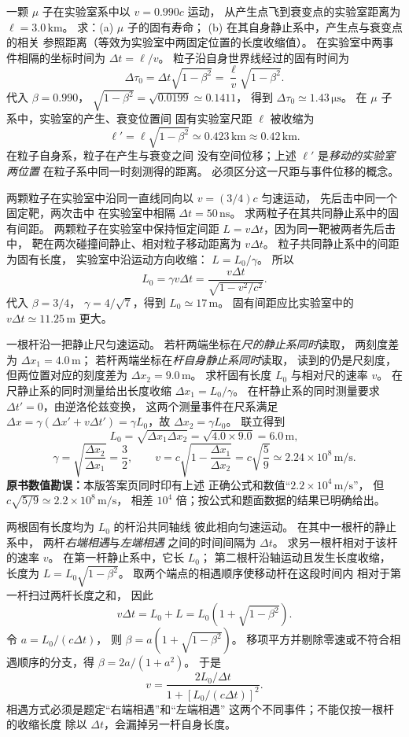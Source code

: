一颗 $\mu$ 子在实验室系中以
$v=0.990c$ 运动，
从产生点飞到衰变点的实验室距离为
$\ell=3.0\,\mathrm{km}$。
求：(a) $\mu$ 子的固有寿命；
(b) 在其自身静止系中，产生点与衰变点的相关
参照距离（等效为实验室中两固定位置的长度收缩值）。
\exsolution
在实验室中两事件相隔的坐标时间为
$\Delta t=\ell/v$。
粒子沿自身世界线经过的固有时间为
\[
\boxed{\Delta\tau_0=
\Delta t\sqrt{1-\beta^2}
=\frac{\ell}{v}\sqrt{1-\beta^2}}.
\]
代入 $\beta=0.990$，
$\sqrt{1-\beta^2}=\sqrt{0.0199}\simeq0.1411$，
得到 $\boxed{\Delta\tau_0\simeq1.43\,\mathrm{\mu s}}$。
在 $\mu$ 子系中，实验室的产生、衰变位置间
固有实验室尺距 $\ell$ 被收缩为
\[
\boxed{\ell'=\ell\sqrt{1-\beta^2}
\simeq0.423\,\mathrm{km}\approx0.42\,\mathrm{km}}.
\]
\excheck 在粒子自身系，粒子在产生与衰变之间
没有空间位移；上述 $\ell'$ 是\emph{移动的实验室两位置}
在粒子系中同一时刻测得的距离。
必须区分这一尺距与事件位移的概念。

两颗粒子在实验室中沿同一直线同向以
$v=(3/4)c$ 匀速运动，
先后击中同一个固定靶，两次击中
在实验室中相隔
$\Delta t=50\,\mathrm{ns}$。
求两粒子在其共同静止系中的固有间距。
\exsolution
两颗粒子在实验室中保持恒定间距
$L=v\Delta t$，因为同一靶被两者先后击中，
靶在两次碰撞间静止、相对粒子移动距离为 $v\Delta t$。
粒子共同静止系中的间距为固有长度，
实验室中沿运动方向收缩：
$L=L_0/\gamma$。
所以
\[
\boxed{L_0=\gamma v\Delta t
=\frac{v\Delta t}{\sqrt{1-v^2/c^2}}}.
\]
代入 $\beta=3/4$，
$\gamma=4/\sqrt7$，得到
$\boxed{L_0\simeq17\,\mathrm m}$。
\excheck 固有间距应比实验室中的
$v\Delta t\simeq11.25\,\mathrm m$ 更大。

一根杆沿一把静止尺匀速运动。
若杆两端坐标在\emph{尺的静止系同时}读取，
两刻度差为 $\Delta x_1=4.0\,\mathrm m$；
若杆两端坐标在\emph{杆自身静止系同时}读取，
读到的仍是尺刻度，但两位置对应的刻度差为
$\Delta x_2=9.0\,\mathrm m$。
求杆固有长度 $L_0$ 与相对尺的速率 $v$。
\exsolution
在尺静止系的同时测量给出长度收缩
$\Delta x_1=L_0/\gamma$。
在杆静止系的同时测量要求
$\Delta t'=0$，由逆洛伦兹变换，
这两个测量事件在尺系满足
$\Delta x=\gamma(\Delta x'+v\Delta t')
=\gamma L_0$，故
$\Delta x_2=\gamma L_0$。
联立得到
\[
\boxed{L_0=\sqrt{\Delta x_1\Delta x_2}
=\sqrt{4.0\times9.0}=6.0\,\mathrm m},
\]
\[
\gamma=\sqrt{\frac{\Delta x_2}{\Delta x_1}}
=\frac32,\qquad
\boxed{v=c\sqrt{1-\frac{\Delta x_1}{\Delta x_2}}
=c\sqrt{\frac59}\simeq2.24\times10^8\,\mathrm{m/s}}.
\]
\excheck \textbf{原书数值勘误：}本版答案页同时印有上述
正确公式和数值“$2.2\times10^4\,\mathrm{m/s}$”，
但 $c\sqrt{5/9}\simeq2.2\times10^8\,\mathrm{m/s}$，
相差 $10^4$ 倍；按公式和题面数据的结果已明确给出。

两根固有长度均为 $L_0$ 的杆沿共同轴线
彼此相向匀速运动。
在其中一根杆的静止系中，
两杆\emph{右端相遇}与\emph{左端相遇}
之间的时间间隔为 $\Delta t$。
求另一根杆相对于该杆的速率 $v$。
\exsolution
在第一杆静止系中，它长 $L_0$；
第二根杆沿轴运动且发生长度收缩，
长度为 $L=L_0\sqrt{1-\beta^2}$。
取两个端点的相遇顺序使移动杆在这段时间内
相对于第一杆扫过两杆长度之和，
因此
\[
v\Delta t=L_0+L
=L_0(1+\sqrt{1-\beta^2}).
\]
令 $a=L_0/(c\Delta t)$，
则 $\beta=a(1+\sqrt{1-\beta^2})$。
移项平方并剔除零速或不符合相遇顺序的分支，得
$\beta=2a/(1+a^2)$。
于是
\[
\boxed{v=\frac{2L_0/\Delta t}{
1+[L_0/(c\Delta t)]^2}}.
\]
\excheck 相遇方式必须是题定“右端相遇”和“左端相遇”
这两个不同事件；不能仅按一根杆的收缩长度
除以 $\Delta t$，会漏掉另一杆自身长度。
